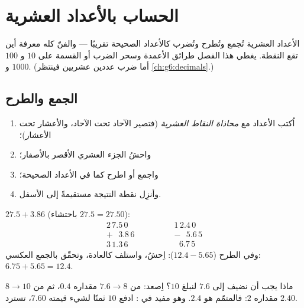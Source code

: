 \chapter{الحساب بالأعداد العشرية}\label{ch:g5:decimalops}

الأعداد العشرية تُجمع وتُطرح وتُضرب كالأعداد الصحيحة تقريبًا
--- والفنّ كله معرفة أين تقع النقطة. يغطي هذا الفصل طرائق
الأعمدة وسحر الضرب أو القسمة على $10$ و $100$ و $1000$. (أما ضرب
عددين عشريين فينتظر \cref{ch:g6:decimals}.)

\section{الجمع والطرح}

\begin{method}\label{met:g5:decimalops:addsub}
\begin{enumerate}
  \item اُكتب الأعداد مع \emph{محاذاة النقاط العشرية}
        (فتصير الآحاد تحت الآحاد، والأعشار تحت الأعشار)؛
  \item واحشُ الجزء العشري الأقصر بالأصفار؛
  \item واجمع أو اطرح كما في الأعداد الصحيحة؛
  \item وأنزِل نقطة النتيجة مستقيمةً إلى الأسفل.
\end{enumerate}
\end{method}

\begin{example}\label{ex:g5:decimalops:addsub}
$27.5 + 3.86$ (باحتشاء $27.5 = 27.50$):
\[
\begin{array}{r}
2\,7.5\,0 \\
+\ \ \ 3.8\,6 \\
\hline
3\,1.3\,6
\end{array}
\qquad\qquad
\begin{array}{r}
1\,2.4\,0 \\
-\ \ \ 5.6\,5 \\
\hline
\ \ \,6.7\,5
\end{array}
\]
وفي الطرح ($12.4 - 5.65$): اِحشُ، واستلف كالعادة، وتحقّق
بالجمع العكسي: $6.75 + 5.65 = 12.4$.
\end{example}

\begin{example}\label{ex:g5:decimalops:complement}
ماذا يجب أن نضيف إلى $7.6$ لنبلغ $10$؟ اِصعد: من $7.6 \to 8$
مقداره $0.4$، ثم من $8 \to 10$ مقداره $2$: فالمتمّم هو $2.4$. وهو
مفيد في : ادفع $10$ ثمنًا لشيء قيمته $7.60$، تسترد $2.40$.
\end{example}

